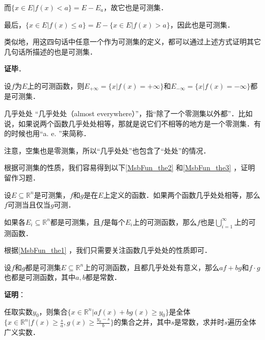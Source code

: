 而$\{x\in E|f(x)<a\}=E-E_a$，故它也是可测集．

最后，$\{x\in E|f(x)\leq a\}=E-\{x\in E|f(x)>a\}$，因此也是可测集．

类似地，用这四句话中任意一个作为可测集的定义，都可以通过上述方式证明其它几句话所描述的也是可测集．

\textbf{证毕}．





\begin{corollary}{}
设$f$为$E$上的可测函数，则$E_{+\infty}=\{x|f(x)=+\infty\}$和$E_{-\infty}=\{x|f(x)=-\infty\}$都是可测集．
\end{corollary}



\begin{definition}{几乎处处}
“几乎处处（almost everywhere）”，指“除了一个零测集以外都”．比如说，如果说两个函数几乎处处相等，那就是说它们不相等的地方是一个零测集．有的时候也用“a. e. ”来简称．
\end{definition}

注意，空集也是零测集，所以“几乎处处”也包含了“处处”的情况．

根据可测集的性质，我们容易得到以下\autoref{MsbFun_the2} 和\autoref{MsbFun_the3} ，证明留作习题．

\begin{theorem}{}\label{MsbFun_the2}
设$E\subseteq\mathbb{R}^n$是可测集，$f$和$g$是在$E$上定义的函数．如果两个函数几乎处处相等，那么$f$可测当且仅当$g$可测．
\end{theorem}



\begin{theorem}{}\label{MsbFun_the3}
如果各$E_i\subseteq\mathbb{R}^n$都是可测集，且$f$是每个$E_i$上的可测函数，那么$f$也是$\bigcup_{i=1}^\infty$上的可测函数．
\end{theorem}

根据\autoref{MsbFun_the1} ，我们只需要关注函数几乎处处的性质即可．

\begin{theorem}{}
设$f$和$g$都是可测集$E\subseteq\mathbb{R}^n$上的可测函数，且都几乎处处有意义，那么$af+bg$和$f\cdot g$也都是可测函数，其中$a, b$都是常数．
\end{theorem}

\textbf{证明}：

任取实数$y_0$，则集合$\{x\in\mathbb{R}^n|af(x)+bg(x)\geq y_0\}$是全体$\{x\in\mathbb{R}^n|f(x)\geq \frac{s}{a}, g(x)\geq \frac{y_0-s}{b}\}$的集合之并，其中$s$是常数，求并时$s$遍历全体广义实数．

